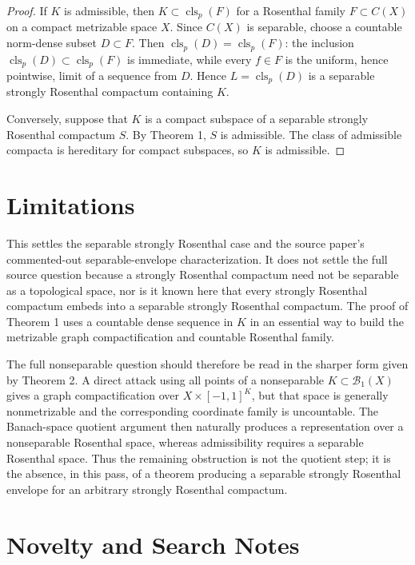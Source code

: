 \documentclass[11pt]{article}
\newcommand{\Baire}{\mathcal B_1}
\newcommand{\clp}{\operatorname{cls}_p}
\begin{document}
\begin{proof}
If \(K\) is admissible, then \(K\subset\clp(F)\) for a Rosenthal family
\(F\subset C(X)\) on a compact metrizable space \(X\).  Since \(C(X)\) is
separable, choose a countable norm-dense subset \(D\subset F\).  Then
\(\clp(D)=\clp(F)\): the inclusion \(\clp(D)\subset\clp(F)\) is immediate,
while every \(f\in F\) is the uniform, hence pointwise, limit of a sequence
from \(D\).  Hence \(L=\clp(D)\) is a separable strongly Rosenthal compactum
containing \(K\).

Conversely, suppose that \(K\) is a compact subspace of a separable strongly
Rosenthal compactum \(S\).  By Theorem 1, \(S\) is admissible.  The class of
admissible compacta is hereditary for compact subspaces, so \(K\) is
admissible.
\end{proof}

\section*{Limitations}

This settles the separable strongly Rosenthal case and the source paper's
commented-out separable-envelope characterization.  It does not settle the full
source question because a strongly Rosenthal compactum need not be separable as
a topological space, nor is it known here that every strongly Rosenthal compactum
embeds into a separable strongly Rosenthal compactum.  The proof of Theorem 1
uses a countable dense sequence in \(K\) in an essential way to build the
metrizable graph compactification and countable Rosenthal family.

The full nonseparable question should therefore be read in the sharper form
given by Theorem 2.  A direct attack using all points of a nonseparable
\(K\subset\Baire(X)\) gives a graph compactification over
\(X\times[-1,1]^K\), but that space is generally nonmetrizable and the
corresponding coordinate family is uncountable.  The Banach-space quotient
argument then naturally produces a representation over a nonseparable
Rosenthal space, whereas admissibility requires a separable Rosenthal space.
Thus the remaining obstruction is not the quotient step; it is the absence, in
this pass, of a theorem producing a separable strongly Rosenthal envelope for
an arbitrary strongly Rosenthal compactum.

\section*{Novelty and Search Notes}
\end{document}
